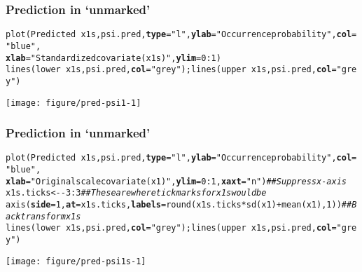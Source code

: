 \documentclass[color=usenames,dvipsnames]{beamer}\usepackage[]{graphicx}\usepackage[]{color}
\makeatletter
\newcommand{\hlnum}[1]{\textcolor[rgb]{0.69,0.494,0}{#1}}%
\newcommand{\hlstr}[1]{\textcolor[rgb]{0.749,0.012,0.012}{#1}}%
\newcommand{\hlcom}[1]{\textcolor[rgb]{0.514,0.506,0.514}{\textit{#1}}}%
\newcommand{\hlopt}[1]{\textcolor[rgb]{0,0,0}{#1}}%
\newcommand{\hlstd}[1]{\textcolor[rgb]{0,0,0}{#1}}%
\newcommand{\hlkwb}[1]{\textcolor[rgb]{0,0.341,0.682}{#1}}%
\newcommand{\hlkwc}[1]{\textcolor[rgb]{0,0,0}{\textbf{#1}}}%
\newcommand{\hlkwd}[1]{\textcolor[rgb]{0.004,0.004,0.506}{#1}}%
\newenvironment{kframe}{%
 \def\at@end@of@kframe{}%
 \ifinner\ifhmode%
  \def\at@end@of@kframe{\end{minipage}}%
  \begin{minipage}{\columnwidth}%
 \fi\fi%
 \def\FrameCommand##1{\hskip\@totalleftmargin \hskip-\fboxsep
 \colorbox{shadecolor}{##1}\hskip-\fboxsep
     \hskip-\linewidth \hskip-\@totalleftmargin \hskip\columnwidth}%
 \MakeFramed {\advance\hsize-\width
   \@totalleftmargin\z@ \linewidth\hsize
   \@setminipage}}%
 {\par\unskip\endMakeFramed%
 \at@end@of@kframe}
\newenvironment{knitrout}{}{} %
\makeatother
\begin{document}
\begin{frame}[fragile]
  \frametitle{Prediction in `unmarked'}
\begin{knitrout}\tiny
{}\color{fgcolor}\begin{kframe}
\begin{alltt}
\hlkwd{plot}\hlstd{(Predicted} \hlopt{~} \hlstd{x1s, psi.pred,} \hlkwc{type}\hlstd{=}\hlstr{"l"}\hlstd{,} \hlkwc{ylab}\hlstd{=}\hlstr{"Occurrence probability"}\hlstd{,} \hlkwc{col}\hlstd{=}\hlstr{"blue"}\hlstd{,}
     \hlkwc{xlab}\hlstd{=}\hlstr{"Standardized covariate (x1s)"}\hlstd{,} \hlkwc{ylim}\hlstd{=}\hlnum{0}\hlopt{:}\hlnum{1}\hlstd{)}
\hlkwd{lines}\hlstd{(lower} \hlopt{~} \hlstd{x1s, psi.pred,} \hlkwc{col}\hlstd{=}\hlstr{"grey"}\hlstd{);} \hlkwd{lines}\hlstd{(upper} \hlopt{~} \hlstd{x1s, psi.pred,} \hlkwc{col}\hlstd{=}\hlstr{"grey"}\hlstd{)}
\end{alltt}
\end{kframe}

{\centering \texttt{[image: figure/pred-psi1-1]} 

}



\end{knitrout}
\end{frame}




\begin{frame}[fragile]
  \frametitle{Prediction in `unmarked'}
\begin{knitrout}\tiny
{}\color{fgcolor}\begin{kframe}
\begin{alltt}
\hlkwd{plot}\hlstd{(Predicted} \hlopt{~} \hlstd{x1s, psi.pred,} \hlkwc{type}\hlstd{=}\hlstr{"l"}\hlstd{,} \hlkwc{ylab}\hlstd{=}\hlstr{"Occurrence probability"}\hlstd{,} \hlkwc{col}\hlstd{=}\hlstr{"blue"}\hlstd{,}
     \hlkwc{xlab}\hlstd{=}\hlstr{"Original scale covariate (x1)"}\hlstd{,} \hlkwc{ylim}\hlstd{=}\hlnum{0}\hlopt{:}\hlnum{1}\hlstd{,} \hlkwc{xaxt}\hlstd{=}\hlstr{"n"}\hlstd{)} \hlcom{## Suppress x-axis}
\hlstd{x1s.ticks} \hlkwb{<-} \hlopt{-}\hlnum{3}\hlopt{:}\hlnum{3}  \hlcom{## These are where tick marks for x1s would be}
\hlkwd{axis}\hlstd{(}\hlkwc{side}\hlstd{=}\hlnum{1}\hlstd{,} \hlkwc{at}\hlstd{=x1s.ticks,} \hlkwc{labels}\hlstd{=}\hlkwd{round}\hlstd{(x1s.ticks}\hlopt{*}\hlkwd{sd}\hlstd{(x1)}\hlopt{+}\hlkwd{mean}\hlstd{(x1),}\hlnum{1}\hlstd{))} \hlcom{## Backtransform x1s}
\hlkwd{lines}\hlstd{(lower} \hlopt{~} \hlstd{x1s, psi.pred,} \hlkwc{col}\hlstd{=}\hlstr{"grey"}\hlstd{);} \hlkwd{lines}\hlstd{(upper} \hlopt{~} \hlstd{x1s, psi.pred,} \hlkwc{col}\hlstd{=}\hlstr{"grey"}\hlstd{)}
\end{alltt}
\end{kframe}

{\centering \texttt{[image: figure/pred-psi1s-1]} 

}



\end{knitrout}
\end{frame}
\end{document}
